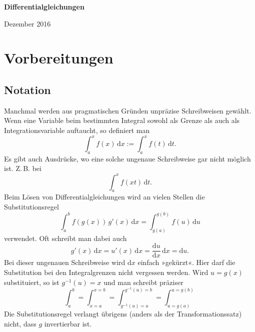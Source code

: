 \documentclass[a4paper,11pt,fleqn,twocolumn,twoside,openany]{scrartcl}
\numberwithin{equation}{section}
\theoremstyle{defstyle}
\numberwithin{Definition}{section}
\begin{document}
\setlength{\abovedisplayskip}{6pt}
\setlength{\belowdisplayskip}{6pt}
\setlength{\abovedisplayshortskip}{6pt}
\setlength{\belowdisplayshortskip}{6pt}

\begin{titlepage}
\centering
\phantom{x}

\vspace{20em}
{\noindent\Huge\sffamily\textbf{Differentialgleichungen}}

\vspace{2em}
{\Large Dezember 2016}\\
\end{titlepage}

\thispagestyle{empty}

\renewcommand{\contentsname}{
\normalfont\sffamily\bfseries\LARGE
Inhaltsverzeichnis}
\tableofcontents

\section{Vorbereitungen}
\subsection{Notation}
Manchmal werden aus pragmatischen Gründen unpräzise Schreibweisen
gewählt. Wenn eine Variable beim bestimmten Integral sowohl als Grenze
als auch als Integrationsvariable auftaucht, so definiert man%
\begin{equation}
\int_a^x f(x)\,\mathrm dx := \int_a^x f(t)\,\mathrm dt.
\end{equation}
Es gibt auch Ausdrücke, wo eine solche ungenaue Schreibweise gar nicht
möglich ist. Z.\,B. bei%
\begin{equation}
\int_a^x f(xt)\,\mathrm dt.
\end{equation}
Beim Lösen von Differentialgleichungen
wird an vielen Stellen die Substitutionsregel%
\begin{equation}
\int_a^b f(g(x))\,g'(x)\,\mathrm dx
= \int_{g(a)}^{g(b)} f(u)\,\mathrm du
\end{equation}
verwendet. Oft schreibt man dabei auch%
\begin{equation}
g'(x)\,\mathrm dx = u'(x)\,\mathrm dx
= \frac{\mathrm du}{\mathrm dx}\,\mathrm dx
= \mathrm du.
\end{equation}
Bei dieser ungenauen Schreibweise wird $\mathrm dx$ einfach
»gekürzt«. Hier darf die Substitution bei den
Integralgrenzen nicht vergessen werden. Wird $u=g(x)$ substituiert,
so ist $g^{-1}(u)=x$ und man schreibt präziser%
\begin{equation}
\int_a^b = \int_{x=a}^{x=b} = \int_{g^{-1}(u)=a}^{g^{-1}(u)=b}
= \int_{u=g(a)}^{u=g(b)}
\end{equation}
Die Substitutionsregel verlangt übrigens (anders als der
Transformationssatz) nicht, dass $g$ invertierbar ist.
\end{document}
